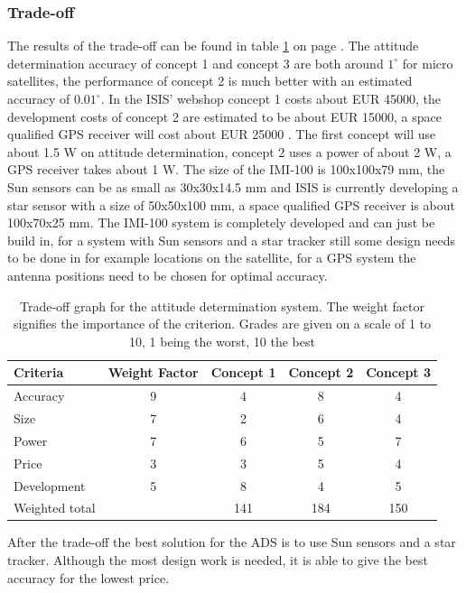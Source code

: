 \subsubsection{Trade-off}
The results of the trade-off can be found in table \ref{tab:adstradeoff} on page \pageref{tab:adstradeoff}. 
The attitude determination accuracy of concept 1 and concept 3 are both around $1^\circ$ for micro satellites, the performance of concept 2 is much better with an estimated accuracy of $0.01^\circ$. 
In the \ac{ISIS}' webshop \cite{cubesatshop} concept 1 costs about EUR 45000, the development costs of concept 2 are estimated to be about EUR 15000, a space qualified \ac{GPS} receiver will cost about EUR 25000 \cite{spacequest}.
The first concept will use about 1.5 W on attitude determination, concept 2 uses a power of about 2 W, a \ac{GPS} receiver takes about 1 W.
The size of the IMI-100 is 100x100x79 mm, the Sun sensors can be as small as 30x30x14.5 mm \cite{tnoweb} and \ac{ISIS} is currently developing a star sensor with a size of 50x50x100 mm, a space qualified \ac{GPS} receiver is about 100x70x25 mm. 
The IMI-100 system is completely developed and can just be build in, for a system with Sun sensors and a star tracker still some design needs to be done in for example locations on the satellite, for a \ac{GPS} system the antenna positions need to be chosen for optimal accuracy.

\begin{table} [h]
\centering
\begin{tabular}{p{3cm} | c | c c c}
\textbf{Criteria} & \textbf{Weight Factor} & \textbf{Concept 1} & \textbf{Concept 2} & \textbf{Concept 3} \\ \hline \hline
Accuracy    & 9 & 4 & 8 & 4\\
Size        & 7 & 2 & 6 & 4\\
Power       & 7 & 6 & 5 & 7\\
Price       & 3 & 3 & 5 & 4\\
Development & 5 & 8 & 4 & 5\\ \hline
Weighted total    &    & 141 & 184 & 150
\end{tabular} 
\caption[Trade-off attitude determination]{Trade-off graph for the attitude determination system. The weight factor signifies the importance of the criterion. Grades are given on a scale of 1 to 10, 1 being the worst, 10 the best}
\label{tab:adstradeoff}
\end{table}

After the trade-off the best solution for the \ac{ADS} is to use Sun sensors and a star tracker. Although the most design work is needed, it is able to give the best accuracy for the lowest price.  

